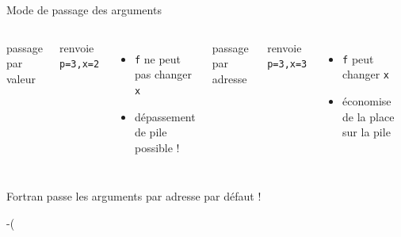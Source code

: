 \documentclass[11pt,mathserif]{beamer}
\newcommand{\scout}{\faAngellist}
\newcommand{\argi}{\faLightbulbO}
\newcommand{\kontuz}{\faExclamationTriangle}
\newcommand{\triste}{\faFrownO}
\newif\ifC
\newcommand{\mylang}{c}
\newcommand{\extlang}{c}
\newcommand{\mylang}{fortran}
\newcommand{\extlang}{f90}
\newcommand{\includeSrc}[1]{}
\begin{document}
\ifC
\begin{frame}{Interlude sur les Pointeurs}
  \lstset{basicstyle=\relsize{-1}\ttfamily}
\begin{itemize}[<+->]
  \item Un pointeur est une variable contenant l'adresse d'une autre
  \item déclaration : \lstinline! int * p; // p est pointeur sur des ints !
  \item allocation  : \lstinline! p = (int *) malloc(4*sizeof(int)); // alloue 4 entiers !
  \item désallocation : \lstinline! free(p); // libere la memoire !
  \item déréfencement : \lstinline! *p = 2 ;! ou \lstinline !p[0] = 2;!
  \item «adresse de» : \lstinline! int t[] = \{1,2,3\} ; p=\&t[0] ; (*p)++;!
  \item[\argi] \lstinline!*! $\circ$ \lstinline!\&! = $I_{valeurs}$ et \lstinline!\&! $\circ$ \lstinline!*! = $I_{adresses}$
  \item arithmétique : \lstinline! for(p=\&t[0]; p\!=\&t[0]+3;) (*(p++))++; !
  \item[\scout] notation : \lstinline! p[i] ! $\equiv$ \lstinline! *(i+p)! $\equiv$ \lstinline! i[p]!
  \item utilisation 
    \begin{itemize}
      \item passage par adresse des arguments de fonction
      \item gestion de mémoire
    \end{itemize}
\end{itemize}
  \lstset{basicstyle=\relsize{-3}\ttfamily}
\end{frame}
\fi
\begin{frame}{Mode de passage des arguments}
\begin{columns}[t]
\pause
\column{5cm}
 passage par valeur
  \includeSrc{code/valeur}
  renvoie \lstinline! p=3,x=2!
  \begin{itemize}
    \item[\triste] {\tt f} ne peut pas changer {\tt x}
    \item[\kontuz] dépassement de pile possible !
   \end{itemize} 
\pause
\column{5cm}
 passage par adresse
  \includeSrc{code/adresse}
  renvoie \lstinline! p=3,x=3!
  \begin{itemize}
    \item[\scout] {\tt f} peut changer {\tt x}
    \item[\argi] économise de la place sur la pile
   \end{itemize} 
\end{columns}
  \begin{center}
\ifC le C passe les arguments par valeur \else Fortran passe les arguments par adresse \fi par défaut !
  \end{center} 
-(\end{frame}
\end{document}
